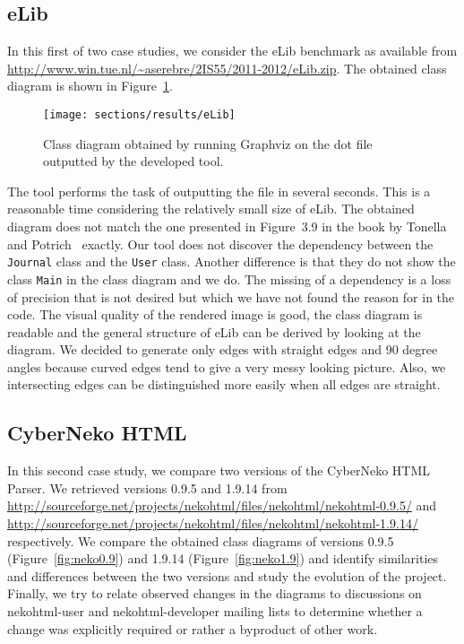 \subsection{eLib}
In this first of two case studies, we consider the eLib benchmark as available from \url{http://www.win.tue.nl/~aserebre/2IS55/2011-2012/eLib.zip}.
The obtained class diagram is shown in Figure~\ref{fig:eLib}.
\begin{figure}[H]
\center
\texttt{[image: sections/results/eLib]}
\caption{Class diagram obtained by running Graphviz on the dot file outputted by the developed tool.}
\label{fig:eLib}
\end{figure}
The tool performs the task of outputting the file in several seconds. 
This is a reasonable time considering the relatively small size of eLib. 
The obtained diagram does not match the one presented in Figure~3.9 in the book by Tonella and Potrich~\cite{rev-eng} exactly. 
Our tool does not discover the dependency between the \texttt{Journal} class and the \texttt{User} class. 
Another difference is that they do not show the class \texttt{Main} in the class diagram and we do.
The missing of a dependency is a loss of precision that is not desired but which we have not found the reason for in the code.
The visual quality of the rendered image is good, the class diagram is readable and the general structure of eLib can be derived by looking at the diagram. 
We decided to generate only edges with straight edges and 90 degree angles because curved edges tend to give a very messy looking picture.
Also, we intersecting edges can be distinguished more easily when all edges are straight.

\subsection{CyberNeko HTML}
In this second case study, we compare two versions of the CyberNeko HTML Parser. We retrieved versions 0.9.5 and 1.9.14 from \url{http://sourceforge.net/projects/nekohtml/files/nekohtml/nekohtml-0.9.5/} and \url{http://sourceforge.net/projects/nekohtml/files/nekohtml/nekohtml-1.9.14/} respectively.  
We compare the obtained class diagrams of versions 0.9.5 (Figure~\ref{fig:neko0.9}) and 1.9.14 (Figure~\ref{fig:neko1.9}) and identify similarities and differences between the two versions and study the evolution of the project.
Finally, we try to relate observed changes in the diagrams to discussions on nekohtml-user and nekohtml-developer mailing lists to determine whether a change was explicitly required or rather a byproduct of other work.

